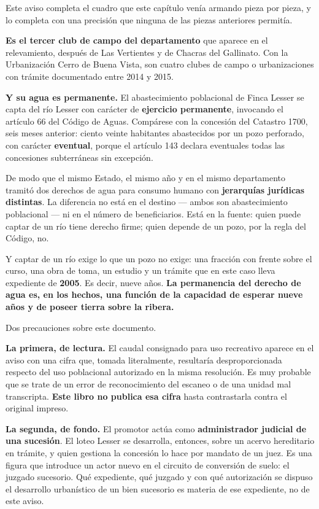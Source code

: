 Este aviso completa el cuadro que este capítulo venía armando pieza por pieza, y lo completa con una precisión que ninguna de las piezas anteriores permitía.

\textbf{Es el tercer club de campo del departamento} que aparece en el relevamiento, después de Las Vertientes y de Chacras del Gallinato. Con la Urbanización Cerro de Buena Vista, son cuatro clubes de campo o urbanizaciones con trámite documentado entre 2014 y 2015.

\textbf{Y su agua es permanente.} El abastecimiento poblacional de Finca Lesser se capta del río Lesser con carácter de \textbf{ejercicio permanente}, invocando el artículo 66 del Código de Aguas. Compárese con la concesión del Catastro 1700, seis meses anterior: ciento veinte habitantes abastecidos por un pozo perforado, con carácter \textbf{eventual}, porque el artículo 143 declara eventuales todas las concesiones subterráneas sin excepción.

De modo que el mismo Estado, el mismo año y en el mismo departamento tramitó dos derechos de agua para consumo humano con \textbf{jerarquías jurídicas distintas}. La diferencia no está en el destino --- ambos son abastecimiento poblacional --- ni en el número de beneficiarios. Está en la fuente: quien puede captar de un río tiene derecho firme; quien depende de un pozo, por la regla del Código, no.

Y captar de un río exige lo que un pozo no exige: una fracción con frente sobre el curso, una obra de toma, un estudio y un trámite que en este caso lleva expediente de \textbf{2005}. Es decir, nueve años. \textbf{La permanencia del derecho de agua es, en los hechos, una función de la capacidad de esperar nueve años y de poseer tierra sobre la ribera.}

\begin{cautela}
Dos precauciones sobre este documento.

\textbf{La primera, de lectura.} El caudal consignado para uso recreativo aparece en el aviso con una cifra que, tomada literalmente, resultaría desproporcionada respecto del uso poblacional autorizado en la misma resolución. Es muy probable que se trate de un error de reconocimiento del escaneo o de una unidad mal transcripta. \textbf{Este libro no publica esa cifra} hasta contrastarla contra el original impreso.

\textbf{La segunda, de fondo.} El promotor actúa como \textbf{administrador judicial de una sucesión}. El loteo Lesser se desarrolla, entonces, sobre un acervo hereditario en trámite, y quien gestiona la concesión lo hace por mandato de un juez. Es una figura que introduce un actor nuevo en el circuito de conversión de suelo: el juzgado sucesorio. Qué expediente, qué juzgado y con qué autorización se dispuso el desarrollo urbanístico de un bien sucesorio es materia de ese expediente, no de este aviso.
\end{cautela}

